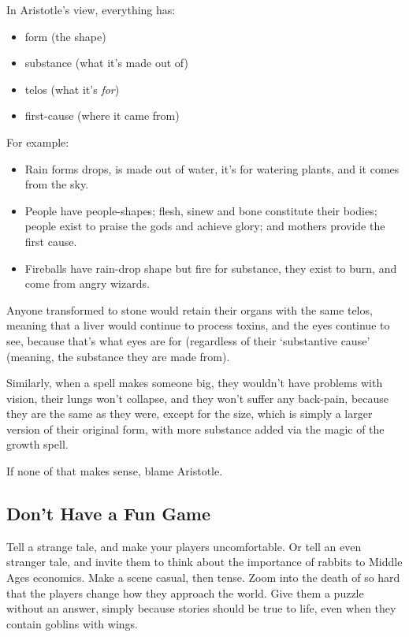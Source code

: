 \begin{multicols}{2}
In Aristotle's view, everything has:

\begin{itemize}
  \item
  form (the shape)
  \item
  substance (what it's made out of)
  \item
  telos (what it's \emph{for})
  \item
  first-cause (where it came from)
\end{itemize}

For example:

\begin{itemize}
  \item
  Rain forms drops, is made out of water, it's for watering plants, and it comes from the sky.
  \item
  People have people-shapes; flesh, sinew and bone constitute their bodies; people exist to praise the gods and achieve glory; and mothers provide the first cause.
  \item
  Fireballs have rain-drop shape but fire for substance, they exist to burn, and come from angry wizards.
\end{itemize}

Anyone transformed to stone would retain their organs with the same telos, meaning that a liver would continue to process toxins, and the eyes continue to see, because that's what eyes are for (regardless of their `substantive cause' (meaning, the substance they are made from).

Similarly, when a spell makes someone big, they wouldn't have problems with vision, their lungs won't collapse, and they won't suffer any back-pain, because they are the same as they were, except for the size, which is simply a larger version of their original form, with more substance added via the magic of the growth spell.

If none of that makes sense, blame Aristotle.

\subsection{Don't Have a Fun Game}

Tell a strange tale, and make your players uncomfortable.
Or tell an even stranger tale, and invite them to think about the importance of rabbits to Middle Ages economics.
Make a scene casual, then tense.
Zoom into the death of  so hard that the players change how they approach the world.
Give them a puzzle without an answer, simply because stories should be true to life, even when they contain goblins with wings.


\end{multicols}
